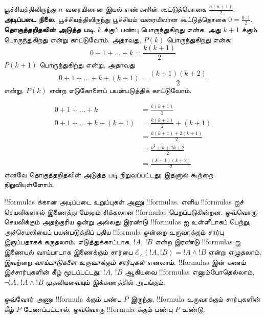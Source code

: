 \documentclass[11pt,a4paper,openany]{memoir}
\begin{document}
\begin{ex}
பூச்சியத்திலிருந்து $n$ வரையிலான இயல் எண்களின் கூட்டுத்தொகை
$\frac{n(n+1)}{2}$. \\

\textbf{அடிப்படை நிலை.} பூச்சியத்திலிருந்து பூச்சியம் வரையிலான கூட்டுத்தொகை
$0=\frac{0\cdot 1}{2}$.\\

\textbf{தொகுத்தறிதலின் அடுத்த படி.} $k$ க்குப் பண்பு
பொருந்துகிறது என்க. அது $k+1$ க்கும் பொருந்துகிறது என்று
காட்டுவோம். அதாவது, $P(k)$ பொருந்துகிறது என்க:
\[ 0 + 1 + \ldots + k = \frac{k(k+1)}{2} \]
$P(k+1)$ பொருந்துகிறது என்று, அதாவது
\[ 0 + 1 + \ldots + k + (k+1) = \frac{(k+1)(k+2)}{2} \]
என்று, $P(k)$ என்ற எடுகோளைப் பயன்படுத்திக் காட்டுவோம்.

\begin{align*}
0 + 1 + \ldots + k &= \frac{k(k+1)}{2} \tag{எடுகோள்} \\
0 + 1 + \ldots + k + (k+1) &= \frac{k(k+1)}{2} + (k+1)
\tag{இரு பக்கங்களிலும் $k+1$ ஐச் சேர்க்க} \\
&= \frac{k(k+1) + 2(k+1)}{2} \\
&= \frac{k^2 + k + 2k +2}{2} \\
&=\frac{(k+1)(k+2)}{2}
\end{align*}
எனவே தொகுத்தறிதலின் அடுத்த படி நிறுவப்பட்டது;
இதனால் கூற்றை நிறுவியுள்ளோம்.
\end{ex}

\begin{explain}
!!{formula}s க்கான அடிப்படை உறுப்புகள் அணு !!{formula}s.
எளிய !!{formula}s ஐச் செயலிகளால் இணைத்து மேலும் சிக்கலான
!!{formula}s பெறப்படுகின்றன. ஒவ்வொரு செயலிக்கும் அதற்குரிய
ஒன்று அல்லது இரண்டு !!{formula}s ஐ உள்ளீடாகப் பெற்று,
அச்செயலியைப் பயன்படுத்திப் புதிய !!{formula} ஒன்றை உருவாக்கும்
சார்பு இருப்பதாகக் கருதலாம். எடுத்துக்காட்டாக,
$!A$, $!B$ என்ற இரண்டு !!{formula}s ஐ இணையல் வாய்பாடாக
இணைக்கும் சார்பை $\mathcal E _\land (!A,
!B) = !A \land !B$ என்று எழுதலாம். இவற்றை
\emph{வாய்பாடுகளை உருவாக்கும் சார்புகள்} எனலாம்.
!!{formula}s இன் கணம் இச்சார்புகளின் கீழ் மூடப்பட்டது:
$!A$, $!B$ ஆகியவை !!{formula}s எனும்போதெல்லாம்,
$\lnot !A$, $!A \land !B$ முதலியவையும் இக்கணத்தில் அடங்கும்.
\end{explain}

\begin{defn}[!!{formula}s மீது தொகுத்தறிதல்]
ஒவ்வோர் அணு !!{formula} க்கும் பண்பு $P$ இருந்து,
!!{formula} உருவாக்கும் சார்புகளின் கீழ் $P$ பேணப்பட்டால்,
ஒவ்வொரு !!{formula} க்கும் பண்பு $P$ உண்டு.
\end{defn}
\end{document}
